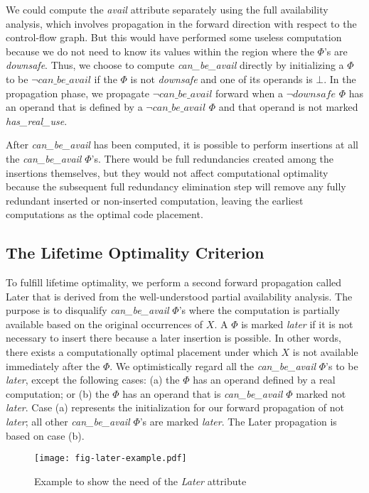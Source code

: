 We could compute the \emph{avail} attribute separately using the full
availability analysis, which involves propagation in the forward direction
with respect to the control-flow graph.  But this would have performed some
useless computation because we do not need to know its values within the region 
where the $\Phi$'s are \emph{downsafe}.  Thus, we choose to compute
\emph{can\_be\_avail} directly by initializing a $\Phi$ to be 
$\neg can\_be\_avail$ if
the $\Phi$ is not \emph{downsafe} and one of its operands is $\bot$.
In the propagation phase, we propagate $\neg can\_be\_avail$ forward when
a $\neg downsafe$  $\Phi$ has an operand that is defined by a 
$\neg can\_be\_avail$ $\Phi$ and that operand is not marked \emph{has\_real\_use}.

After \emph{can\_be\_avail} has been computed, it is possible to perform 
insertions at
all the \emph{can\_be\_avail} $\Phi$'s.  There would be full redundancies
created among the insertions themselves, but they would not affect 
computational optimality because the subsequent full redundancy elimination 
step will remove any fully redundant inserted or non-inserted computation, 
leaving the earliest computations as the optimal code placement.

\subsection{The Lifetime Optimality Criterion}

To fulfill lifetime optimality, we perform a second forward propagation called
Later that is derived from the well-understood partial availability 
analysis.  The purpose is to disqualify \emph{can\_be\_avail} $\Phi$'s where
the computation is
partially available based on the original occurrences of $X$.
A $\Phi$ is marked \emph{later} if it is not necessary to insert there because
a later insertion is possible.  In other words, there exists a computationally
optimal placement under which $X$ is not available immediately after the $\Phi$.
We optimistically regard all the
\emph{can\_be\_avail} $\Phi$'s to be \emph{later}, except the following cases:
(a) the $\Phi$ has an operand defined by a real computation; or (b) the $\Phi$
has an operand that is \emph{can\_be\_avail} $\Phi$ marked not \emph{later}.  Case (a) represents
the initialization for our forward propagation of not \emph{later}; all other
\emph{can\_be\_avail} $\Phi$'s are marked \emph{later}.  The Later
propagation is based on case (b).

\begin{figure}
\centering
\texttt{[image: fig-later-example.pdf]}
\caption{Example to show the need of the \emph{Later} attribute}
\label{fig:later-example}
\end{figure}

